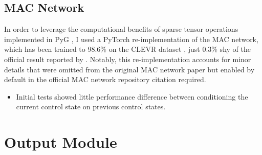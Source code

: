 \subsection{MAC Network}
\label{subsection:mac_network}

In order to leverage the computational benefits of sparse tensor operations implemented in PyG \cite{fey2019fast}, I used a PyTorch \cite{paszke2019pytorch} re-implementation of the MAC network, which has been trained to 98.6\% on the CLEVR dataset \cite{eyzaguirre2020differentiable}, just 0.3\% shy of the official result reported by 
\citeauthor{hudson2018compositional}. Notably, this re-implementation accounts for minor details that were omitted from the original MAC network paper but enabled by default in the official MAC network repository {\color{red} citation required}.

\begin{itemize}
  \item Initial tests showed little performance difference between conditioning the current control state on previous control states. %
\end{itemize}

\section{Output Module}
\label{section:output_module}
